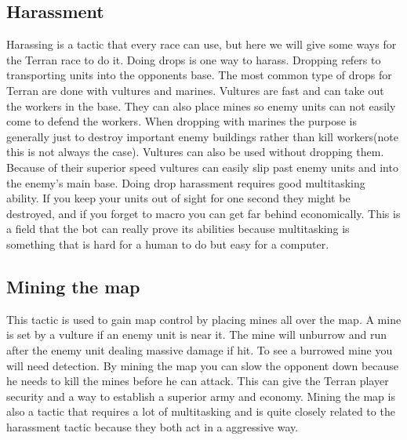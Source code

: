 	\subsection{Harassment}
		Harassing is a tactic that every race can use, but here we will give some ways for the Terran race to do it. 
		Doing drops is one way to harass. Dropping refers to transporting units into the opponents base. 
		The most common type of drops for Terran are done with vultures and marines. Vultures are fast and can take out the workers in the base. 
		They can also place mines so enemy units can not easily come to defend the workers. When dropping with marines 
		the purpose is generally just to destroy important enemy buildings rather than kill workers(note this is not always the case). 
		Vultures can also be used without dropping them. 
		Because of their superior speed vultures can easily slip past enemy units and into the enemy's main base. Doing drop harassment requires 
		good multitasking ability. If you keep your units out of sight for one second they might be destroyed, 
		and if you forget to macro you can get far behind economically. 
		This is a field that the bot can really prove its abilities because 
		multitasking is something that is hard for a human to do but easy for a computer.
	
	\subsection{Mining the map}
		This tactic is used to gain map control by placing mines all over the map. A mine is set by a vulture 
		if an enemy unit is near it. The mine will unburrow and run after the enemy unit dealing massive damage if hit. To see a burrowed mine you will need 
		detection. By mining the map you can slow the opponent down because he needs to kill the mines before he can attack. 
		This can give the Terran player security and a way to establish a superior army and economy. 
		Mining the map is also a tactic that requires a lot of multitasking and is quite closely related to the harassment tactic because they both act in a 
		aggressive way.